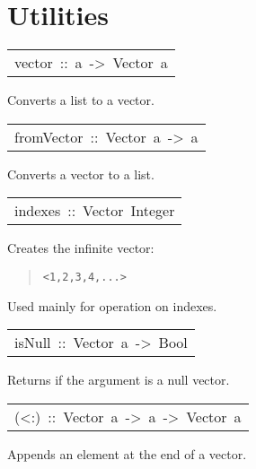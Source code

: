 \section{Utilities}
\begin{haddockdesc}
\item[\begin{tabular}{@{}l}
vector\ ::\ {\char 91}a{\char 93}\ ->\ Vector\ a
\end{tabular}]\haddockbegindoc
Converts a list to a vector.\par

\end{haddockdesc}
\begin{haddockdesc}
\item[\begin{tabular}{@{}l}
fromVector\ ::\ Vector\ a\ ->\ {\char 91}a{\char 93}
\end{tabular}]\haddockbegindoc
Converts a vector to a list.\par

\end{haddockdesc}
\begin{haddockdesc}
\item[\begin{tabular}{@{}l}
indexes\ ::\ Vector\ Integer
\end{tabular}]\haddockbegindoc
Creates the infinite vector:\par
\begin{quote}
{\haddockverb\begin{verbatim}
<1,2,3,4,...>\end{verbatim}}
\end{quote}
Used mainly for operation on indexes.\par

\end{haddockdesc}
\begin{haddockdesc}
\item[\begin{tabular}{@{}l}
isNull\ ::\ Vector\ a\ ->\ Bool
\end{tabular}]\haddockbegindoc
Returns  if the argument is a null vector.\par

\end{haddockdesc}
\begin{haddockdesc}
\item[\begin{tabular}{@{}l}
(<:)\ ::\ Vector\ a\ ->\ a\ ->\ Vector\ a
\end{tabular}]\haddockbegindoc
Appends an element at the end of a vector.\par

\end{haddockdesc}
